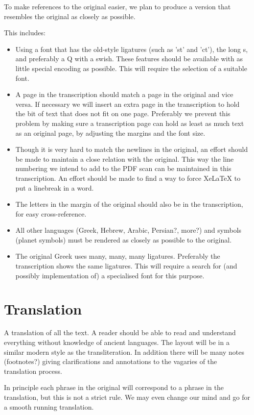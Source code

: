 \documentclass{report}
\begin{document}
To make references to the original easier, we plan to produce a version that
resembles the original as closely as possible.

This includes:
\begin{itemize}
\item Using a font that has the old-style ligatures (such as 'st' and 'ct'),
the long s, and preferably a Q with a swish.
These features should be available with as little special encoding as possible.
This will require the selection of a suitable font.
\item A page in the transcription should match a page in the original and
vice versa.
If necessary we will insert an
extra page in the transcription to hold the bit of text that does not fit
on one page.
Preferably we prevent this problem
by making sure a transcription page can hold as least as much text as an
original page, by adjusting the margins
and the font size.
\item Though it is very hard to match the newlines in the original, an effort
should be made to maintain a close relation with the original.
This way the line numbering we intend to add to the PDF scan can be maintained
in this transcription.
An effort should be made to find a way to force XeLaTeX to put a linebreak
in a word.
\item The letters in the margin of the original should also be in the
transcription, for easy cross-reference.
\item All other languages (Greek, Hebrew, Arabic, Persian?, more?)
and symbols (planet symbols) must be rendered
as closely as possible to the original.
\item The original Greek uses many, many, many ligatures.
Preferably the transcription shows the same ligatures.
This will require a search for (and possibly implementation of) a specialised
font for this purpose.
\end{itemize}

\section{Translation}
A translation of all the text.
A reader should be able to read and understand everything without knowledge
of ancient languages.
The layout will be in a similar modern style as the transliteration.
In addition there will be many notes 
(footnotes?) giving clarifications and annotations to the vagaries of the
translation process.

In principle each phrase in the original will correspond to a phrase in the
translation, but this is not a strict rule.
We may even change our mind and go for a smooth running translation.
\end{document}
